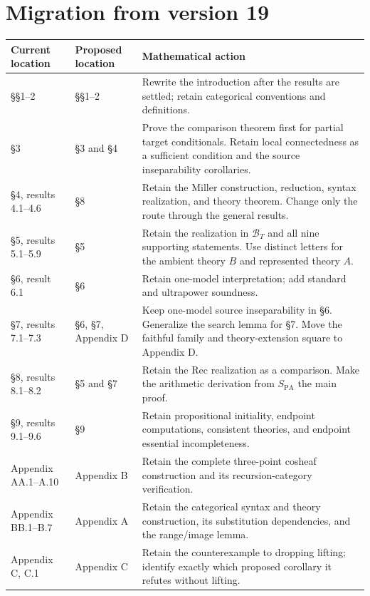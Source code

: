 \documentclass[11pt]{article}
\theoremstyle{definition}\newtheorem{definition}[theorem]{Definition}
\newcommand{\PA}{\mathrm{PA}}
\newcommand{\B}{\mathcal B}
\begin{document}
\begingroup\small
\tableofcontents
\endgroup
\newpage

\section*{Migration from version 19}
\begin{longtable}{@{}>{\raggedright\arraybackslash}p{}>{\raggedright\arraybackslash}p{}>{\raggedright\arraybackslash}p{}@{}}
\toprule
Current location & Proposed location & Mathematical action\\\midrule\endhead
\S\S1--2 & \S\S1--2 & Rewrite the introduction after the results are settled; retain categorical conventions and definitions.\\
\S3 & \S3 and \S4 & Prove the comparison theorem first for partial target conditionals. Retain local connectedness as a sufficient condition and the source inseparability corollaries.\\
\S4, results 4.1--4.6 & \S8 & Retain the Miller construction, reduction, syntax realization, and theory theorem. Change only the route through the general results.\\
\S5, results 5.1--5.9 & \S5 & Retain the realization in $\B_T$ and all nine supporting statements. Use distinct letters for the ambient theory $B$ and represented theory $A$.\\
\S6, result 6.1 & \S6 & Retain one-model interpretation; add standard and ultrapower soundness.\\
\S7, results 7.1--7.3 & \S6, \S7, Appendix D & Keep one-model source inseparability in \S6. Generalize the search lemma for \S7. Move the faithful family and theory-extension square to Appendix D.\\
\S8, results 8.1--8.2 & \S5 and \S7 & Retain the $\mathrm{Rec}$ realization as a comparison. Make the arithmetic derivation from $S_{\PA}$ the main proof.\\
\S9, results 9.1--9.6 & \S9 & Retain propositional initiality, endpoint computations, consistent theories, and endpoint essential incompleteness.\\
Appendix A\newline A.1--A.10 & Appendix B & Retain the complete three-point cosheaf construction and its recursion-category verification.\\
Appendix B\newline B.1--B.7 & Appendix A & Retain the categorical syntax and theory construction, its substitution dependencies, and the range/image lemma.\\
Appendix C, C.1 & Appendix C & Retain the counterexample to dropping lifting; identify exactly which proposed corollary it refutes without lifting.\\
\bottomrule
\end{longtable}
\end{document}
